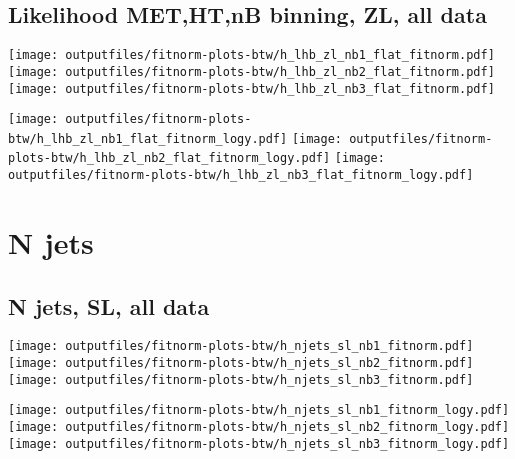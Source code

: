 \documentclass[11pt]{article}
\begin{document}
   \clearpage

    \subsection{ Likelihood MET,HT,nB binning, ZL, all data}

    \noindent
     \texttt{[image: outputfiles/fitnorm-plots-btw/h\_lhb\_zl\_nb1\_flat\_fitnorm.pdf]}
     \texttt{[image: outputfiles/fitnorm-plots-btw/h\_lhb\_zl\_nb2\_flat\_fitnorm.pdf]}
     \texttt{[image: outputfiles/fitnorm-plots-btw/h\_lhb\_zl\_nb3\_flat\_fitnorm.pdf]}

    \noindent
     \texttt{[image: outputfiles/fitnorm-plots-btw/h\_lhb\_zl\_nb1\_flat\_fitnorm\_logy.pdf]}
     \texttt{[image: outputfiles/fitnorm-plots-btw/h\_lhb\_zl\_nb2\_flat\_fitnorm\_logy.pdf]}
     \texttt{[image: outputfiles/fitnorm-plots-btw/h\_lhb\_zl\_nb3\_flat\_fitnorm\_logy.pdf]}

   \clearpage







  \clearpage
   \section{ N jets }

    \subsection{ N jets, SL, all data}

    \noindent
     \texttt{[image: outputfiles/fitnorm-plots-btw/h\_njets\_sl\_nb1\_fitnorm.pdf]}
     \texttt{[image: outputfiles/fitnorm-plots-btw/h\_njets\_sl\_nb2\_fitnorm.pdf]}
     \texttt{[image: outputfiles/fitnorm-plots-btw/h\_njets\_sl\_nb3\_fitnorm.pdf]}

    \noindent
     \texttt{[image: outputfiles/fitnorm-plots-btw/h\_njets\_sl\_nb1\_fitnorm\_logy.pdf]}
     \texttt{[image: outputfiles/fitnorm-plots-btw/h\_njets\_sl\_nb2\_fitnorm\_logy.pdf]}
     \texttt{[image: outputfiles/fitnorm-plots-btw/h\_njets\_sl\_nb3\_fitnorm\_logy.pdf]}

   \clearpage
\end{document}
